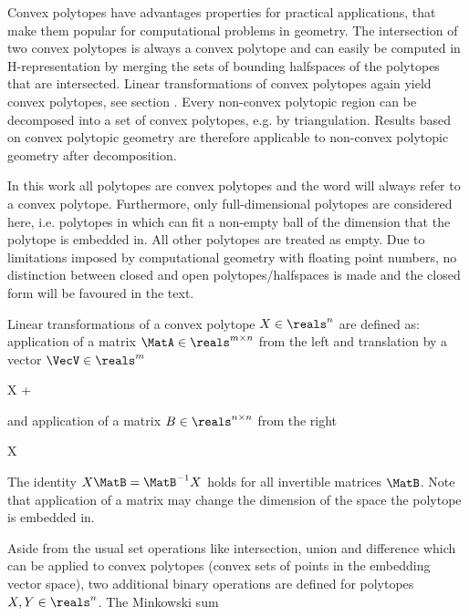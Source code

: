 \startsubsection[title={Properties of Convex Polytopes}]

    Convex polytopes have advantages properties for practical applications, that make them popular for computational problems in geometry.
    The intersection of two convex polytopes is always a convex polytope and can easily be computed in H-representation by merging the sets of bounding halfspaces of the polytopes that are intersected.
    Linear transformations of convex polytopes again yield convex polytopes, see section .
    Every non-convex polytopic region can be decomposed into a set of convex polytopes, e.g. by triangulation.
    Results based on convex polytopic geometry are therefore applicable to non-convex polytopic geometry after decomposition.

    In this work all polytopes are convex polytopes and the word  will always refer to a convex polytope.
    Furthermore, only full-dimensional polytopes are considered here, i.e. polytopes in which can fit a non-empty ball of the dimension that the polytope is embedded in.
    All other polytopes are treated as empty.
    Due to limitations imposed by computational geometry with floating point numbers, no distinction between closed and open polytopes/halfspaces is made and the closed form will be favoured in the text.

\stopsubsection


\startsubsection[title={Operations on Convex Polytopes},reference=sec:theory-geometry-operations]

    Linear transformations of a convex polytope $X \in \reals^n$ are defined as:
    application of a matrix $\MatA \in \reals^{m \times n}$ from the left and translation by a vector $\VecV \in \reals^m$

    \startformula
        \MatA X + \VecV \colonequals {}
    \stopformula

    and application of a matrix $B \in \reals^{n \times n}$ from the right

    \startformula
        X \MatB \colonequals {} \EndPeriod
    \stopformula

    The identity $X\MatB = \MatB^{-1}X$ holds for all invertible matrices $\MatB$.
    Note that application of a matrix may change the dimension of the space the polytope is embedded in.

    Aside from the usual set operations like intersection, union and difference which can be applied to convex polytopes (convex sets of points in the embedding vector space), two additional binary operations are defined for polytopes $X, Y \in \reals^n$. The Minkowski sum

